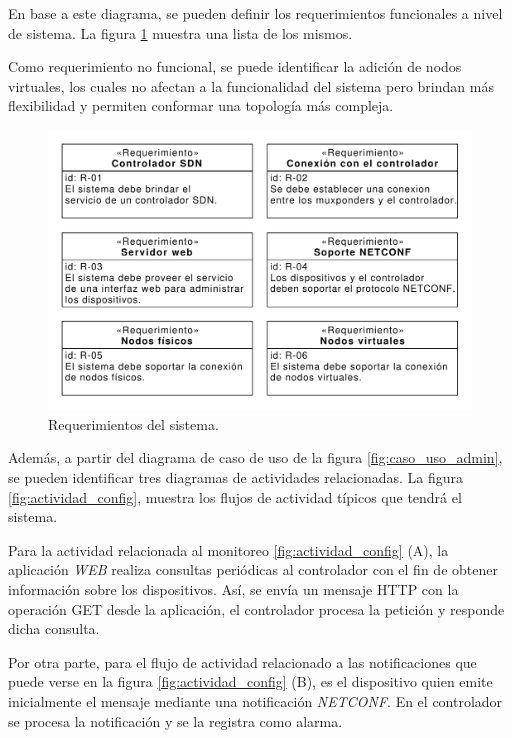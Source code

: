   En base a este diagrama, se pueden definir los requerimientos funcionales a nivel de sistema. La figura \ref{fig:req_sys} muestra una lista de los mismos. 
  
  Como requerimiento no funcional, se puede identificar la adición de nodos virtuales, los cuales no afectan a la funcionalidad del sistema pero brindan más flexibilidad y permiten conformar una topología más compleja.

  \begin{figure}[H]
    \centering
    \includegraphics[scale=0.65]{Figures/req_sys.pdf}
    \caption{Requerimientos del sistema.}
    \label{fig:req_sys}
  \end{figure}


  Además, a partir del diagrama de caso de uso de la figura \ref{fig:caso_uso_admin}, se pueden identificar tres diagramas de actividades relacionadas. La figura \ref{fig:actividad_config}, muestra los flujos de actividad típicos que tendrá el sistema. 
  
  Para la actividad relacionada al monitoreo \ref{fig:actividad_config} (A), la aplicación \textit{WEB} realiza consultas periódicas al controlador con el fin de obtener información sobre los dispositivos. Así, se envía un mensaje HTTP con la operación GET desde la aplicación, el controlador procesa la petición y responde dicha consulta.

Por otra parte, para el flujo de actividad relacionado a las notificaciones que puede verse en la figura \ref{fig:actividad_config} (B), es el dispositivo quien emite inicialmente el mensaje mediante una notificación \textit{NETCONF}. En el controlador se procesa la notificación y se la registra como alarma.

